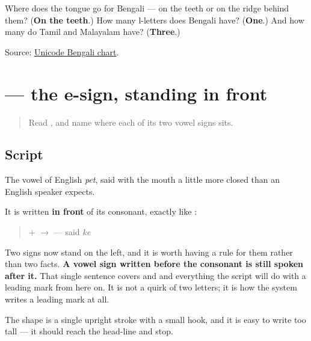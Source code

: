 \begin{tcolorbox}[breakable,colback=teal!4,colframe=teal!35!black,title={Before you move on}]
Where does the tongue go for Bengali \textbf{} — on the teeth or on the ridge behind them? (\textbf{On the teeth}.) How many l-letters does Bengali have? (\textbf{One}.) And how many do Tamil and Malayalam have? (\textbf{Three}.)

Source: \href{https://www.unicode.org/charts/PDF/U0980.pdf}{Unicode Bengali chart}.
\end{tcolorbox}
\section[\texorpdfstring{\bn{ে} (-e)}{ে (-e)}]{ — the e-sign, standing in front}

\label{lesson:BN-W02-e-matra}



\begin{quote}
Read \textbf{}, and name where each of its two vowel signs sits.
\end{quote}

\subsection*{Script}
\begin{quote}
\end{quote}

The vowel of English \emph{pet}, said with the mouth a little more closed than an English speaker expects.

It is written \textbf{in front} of its consonant, exactly like \textbf{}:

\begin{quote}
\textbf{} + \textbf{} $\to$ \textbf{} — said \emph{ke}
\end{quote}

Two signs now stand on the left, and it is worth having a rule for them rather than two facts. \textbf{A vowel sign written before the consonant is still spoken after it.} That single sentence covers \textbf{} and \textbf{} and everything the script will do with a leading mark from here on. It is not a quirk of two letters; it is how the system writes a leading mark at all.

The shape is a single upright stroke with a small hook, and it is easy to write too tall — it should reach the head-line and stop.

